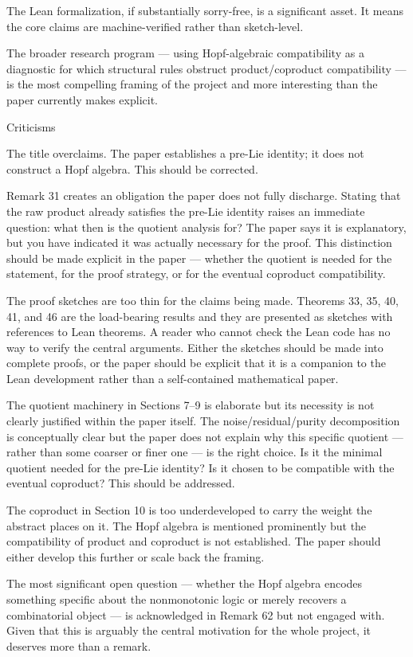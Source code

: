 \documentclass[a4paper,11pt]{report}
\begin{document}
The Lean formalization, if substantially sorry-free, is a significant asset. It means the core claims are machine-verified rather than sketch-level.

The broader research program — using Hopf-algebraic compatibility as a diagnostic for which structural rules obstruct product/coproduct compatibility — is the most compelling framing of the project and more interesting than the paper currently makes explicit.

Criticisms

The title overclaims. The paper establishes a pre-Lie identity; it does not construct a Hopf algebra. This should be corrected.

Remark 31 creates an obligation the paper does not fully discharge. Stating that the raw product already satisfies the pre-Lie identity raises an immediate question: what then is the quotient analysis for? The paper says it is explanatory, but you have indicated it was actually necessary for the proof. This distinction should be made explicit in the paper — whether the quotient is needed for the statement, for the proof strategy, or for the eventual coproduct compatibility.

The proof sketches are too thin for the claims being made. Theorems 33, 35, 40, 41, and 46 are the load-bearing results and they are presented as sketches with references to Lean theorems. A reader who cannot check the Lean code has no way to verify the central arguments. Either the sketches should be made into complete proofs, or the paper should be explicit that it is a companion to the Lean development rather than a self-contained mathematical paper.

The quotient machinery in Sections 7–9 is elaborate but its necessity is not clearly justified within the paper itself. The noise/residual/purity decomposition is conceptually clear but the paper does not explain why this specific quotient — rather than some coarser or finer one — is the right choice. Is it the minimal quotient needed for the pre-Lie identity? Is it chosen to be compatible with the eventual coproduct? This should be addressed.

The coproduct in Section 10 is too underdeveloped to carry the weight the abstract places on it. The Hopf algebra is mentioned prominently but the compatibility of product and coproduct is not established. The paper should either develop this further or scale back the framing.

The most significant open question — whether the Hopf algebra encodes something specific about the nonmonotonic logic or merely recovers a combinatorial object — is acknowledged in Remark 62 but not engaged with. Given that this is arguably the central motivation for the whole project, it deserves more than a remark.
\end{document}
